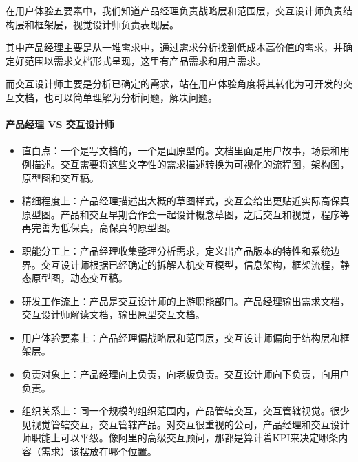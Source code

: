 \documentclass[letterpaper,11pt,english]{sphinxmanual}
\begin{document}
在用户体验五要素中，我们知道产品经理负责战略层和范围层，交互设计师负责结构层和框架层，视觉设计师负责表现层。

其中产品经理主要是从一堆需求中，通过需求分析找到低成本高价值的需求，并确定好范围以需求文档形式呈现，这里有产品需求和用户需求。

而交互设计师主要是分析已确定的需求，站在用户体验角度将其转化为可开发的交互文档，也可以简单理解为分析问题，解决问题。


\paragraph{产品经理 VS 交互设计师}
\label{\detokenize{chapter_knowledge/IXD_analysis:vs}}\begin{itemize}
\item {} 
直白点：一个是写文档的，一个是画原型的。文档里面是用户故事，场景和用例描述。交互需要将这些文字性的需求描述转换为可视化的流程图，架构图，原型图和交互稿。%
\begin{footnote}[544]\sphinxAtStartFootnote
{}
%
\end{footnote}

\item {} 
精细程度上：产品经理描述出大概的草图样式，交互会给出更贴近实际高保真原型图。产品和交互早期合作会一起设计概念草图，之后交互和视觉，程序等再完善为低保真，高保真的原型图。

\item {} 
职能分工上：产品经理收集整理分析需求，定义出产品版本的特性和系统边界。交互设计师根据已经确定的拆解人机交互模型，信息架构，框架流程，静态原型图，动态交互稿。

\item {} 
研发工作流上：产品是交互设计师的上游职能部门。产品经理输出需求文档，交互设计师解读文档，输出原型交互文档。

\item {} 
用户体验要素上：产品经理偏战略层和范围层，交互设计师偏向于结构层和框架层。

\item {} 
负责对象上：产品经理向上负责，向老板负责。交互设计师向下负责，向用户负责。

\item {} 
组织关系上：同一个规模的组织范围内，产品管辖交互，交互管辖视觉。很少见视觉管辖交互，交互管辖产品。对交互很重视的公司，产品经理和交互设计师职能上可以平级。像阿里的高级交互顾问，那都是算计着KPI来决定哪条内容（需求）该摆放在哪个位置。


\end{itemize}
\end{document}
